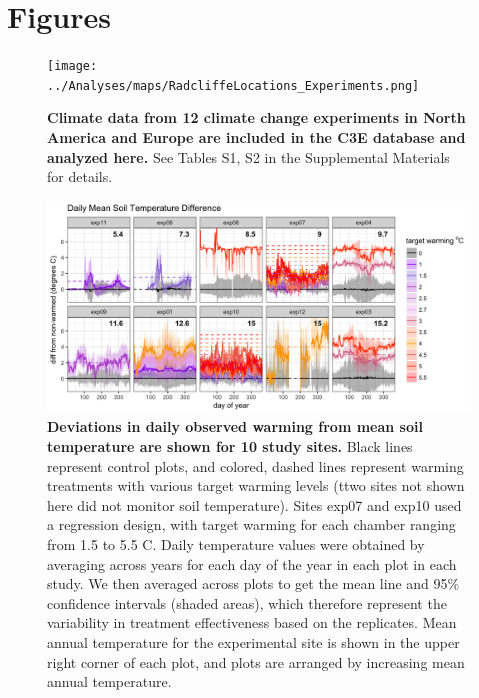 \documentclass{article}
\begin{document}
\section* {Figures}


\begin{figure}[p]
\centering
\texttt{[image: ../Analyses/maps/RadcliffeLocations\_Experiments.png]} 
\caption{\textbf{Climate data from 12 climate change experiments in North America and Europe are included in the C3E database and analyzed here.} See Tables S1, S2 in the Supplemental Materials for details.} 
 \label{fig:map}
 \end{figure}
\clearpage
\begin{figure}[h]
\centering
 \includegraphics{../Analyses/figures/Exploratory_TimeSeries_SoilTemp1Mean_Deviation.png}
 \caption{\textbf{Deviations in daily observed warming from mean soil temperature are shown for 10 study sites.} Black lines represent control plots, and colored, dashed lines represent warming treatments with various target warming levels (ttwo sites not shown here did not monitor soil temperature). Sites exp07 and exp10 used a regression design, with target warming for each chamber ranging from 1.5 to 5.5 \degree C. Daily temperature values were obtained by averaging across years for each day of the year in each plot in each study. We then averaged across plots to get the mean line and 95\% confidence intervals (shaded areas), which therefore represent the variability in treatment effectiveness based on the replicates. Mean annual temperature for the experimental site is shown in the upper right corner of each plot, and plots are arranged by increasing mean annual temperature.}
 \label{fig:effwarm}

 \end{figure}
\end{document}
